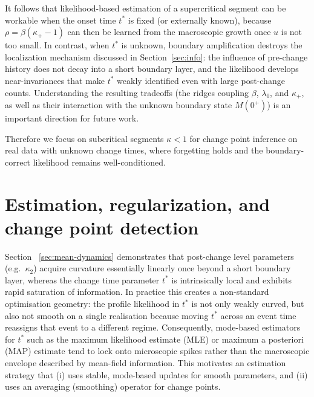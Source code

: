 \documentclass{article}
\theoremstyle{plain}
\theoremstyle{definition}
\newcommand{\1}{\mathbf{1}}
\begin{document}
    It follows that likelihood-based estimation of a supercritical segment can be workable when the onset time \(t^\ast\) is fixed
    (or externally known), because \(\rho=\beta(\kappa_+-1)\) can then be learned from the macroscopic growth
    once \(u\) is not too small. In contrast, when \(t^\ast\) is unknown, boundary amplification destroys the
    localization mechanism discussed in Section~\ref{sec:info}: the influence of pre-change history does not
    decay into a short boundary layer, and the likelihood develops near-invariances that make \(t^\ast\) weakly
    identified even with large post-change counts. Understanding the resulting tradeoffs (the 
    ridges coupling \(\beta\), \(\lambda_0\), and \(\kappa_+\), as well as their interaction with the unknown boundary state \(M(0^+)\)) is an important direction for future work.
    
    Therefore we focus on subcritical segments \(\kappa<1\) for change point
    inference on real data with unknown change times, where forgetting holds and the boundary-correct likelihood
    remains well-conditioned.

    
  \section{Estimation, regularization, and change point detection}
\label{sec:estimation}

Section ~\ref{sec:mean-dynamics} demonstrates that post-change level parameters (e.g.\ $\kappa_2$) acquire curvature essentially linearly once beyond a short boundary layer, whereas the change time parameter $t^\ast$ is intrinsically local and exhibits rapid saturation of information. In practice this creates a non-standard optimisation geometry: the profile likelihood in $t^\ast$ is not only weakly curved, but also not smooth on a single realisation because moving $t^\ast$ across an event time reassigns that event to a different regime. Consequently, mode-based estimators for $t^\ast$ such as the maximum likelihood estimate (MLE) or maximum a posteriori (MAP) estimate tend to lock onto microscopic spikes rather than the macroscopic envelope described by mean-field information. This motivates an estimation strategy that (i) uses stable, mode-based updates for smooth parameters, and (ii) uses an averaging (smoothing) operator for change points. 
\end{document}
